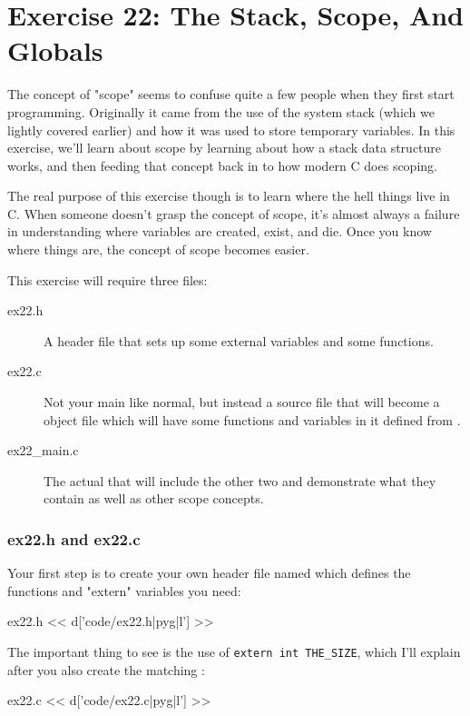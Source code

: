 \chapter{Exercise 22: The Stack, Scope, And Globals}

The concept of "scope" seems to confuse quite a few people when they first
start programming.  Originally it came from the use of the system stack
(which we lightly covered earlier) and how it was used to store temporary
variables.  In this exercise, we'll learn about scope by learning about
how a stack data structure works, and then feeding that concept back in
to how modern C does scoping.

The real purpose of this exercise though is to learn where the hell things
live in C.  When someone doesn't grasp the concept of scope, it's almost
always a failure in understanding where variables are created, exist, and
die.  Once you know where things are, the concept of scope becomes easier.

This exercise will require three files:

\begin{description}
\item[ex22.h] A header file that sets up some external variables and some functions.
\item[ex22.c] Not your main like normal, but instead a source file that will become
    a object file  which will have some functions and variables in it
    defined from .
\item[ex22\_main.c] The actual  that will include the other two and
    demonstrate what they contain as well as other scope concepts.
\end{description}

\subsection{ex22.h and ex22.c}

Your first step is to create your own header file named  which
defines the functions and "extern" variables you need:

\begin{code}{ex22.h}
<< d['code/ex22.h|pyg|l'] >>
\end{code}

The important thing to see is the use of \verb|extern int THE_SIZE|, which I'll
explain after you also create the matching :

\begin{code}{ex22.c}
<< d['code/ex22.c|pyg|l'] >>
\end{code}

